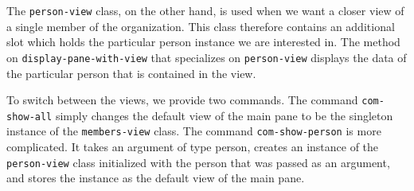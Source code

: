 The \texttt{person-view} class, on the other hand, is used when we
want a closer view of a single member of the organization.  This class
therefore contains an additional slot which holds the particular
person instance we are interested in.  The method on
\texttt{display-pane-with-view} that specializes on
\texttt{person-view} displays the data of the particular person that
is contained in the view.

To switch between the views, we provide two commands.  The command
\texttt{com-show-all} simply changes the default view of the main pane
to be the singleton instance of the \texttt{members-view} class.  The
command \texttt{com-show-person} is more complicated.  It takes an
argument of type person, creates an instance of the
\texttt{person-view} class initialized with the person that was passed
as an argument, and stores the instance as the default view of the
main pane.

